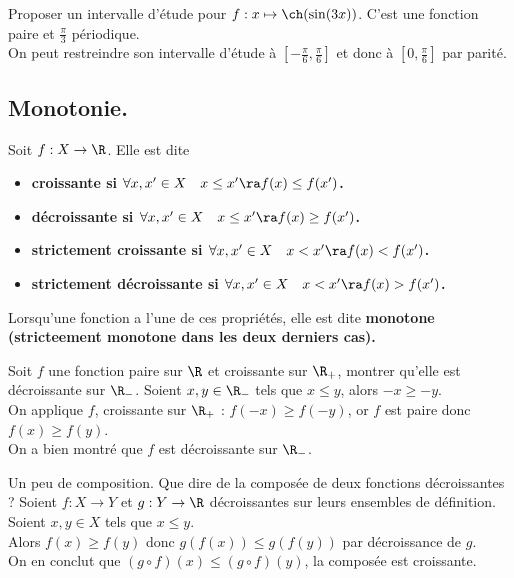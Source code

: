 \documentclass[11pt]{article}
\begin{document}
\begin{ex}{}{}
    Proposer un intervalle d'étude pour $f:x\mapsto\ch(\sin(3x))$.
    \tcblower
    C'est une fonction paire et $\frac{\pi}{3}$ périodique.\\
    On peut restreindre son intervalle d'étude à $[-\frac{\pi}{6},\frac{\pi}{6}]$ et donc à $[0,\frac{\pi}{6}]$ par parité.
\end{ex}

\subsection{Monotonie.}

\begin{defi}{}{}
    Soit $f:X\to\R$. Elle est dite
    \begin{itemize}
        \item \bf{croissante} si $\forall x,x'\in X\quad x\leq x' \ra f(x)\leq f(x')$.
        \item \bf{décroissante} si $\forall x,x'\in X\quad x\leq x' \ra f(x)\geq f(x')$.
        \item \bf{strictement croissante} si $\forall x,x'\in X\quad x< x' \ra f(x)< f(x')$.
        \item \bf{strictement décroissante} si $\forall x,x'\in X\quad x< x' \ra f(x)> f(x')$.
    \end{itemize}
    Lorsqu'une fonction a l'une de ces propriétés, elle est dite \bf{monotone} (stricteement monotone dans les deux derniers cas).
\end{defi}

\begin{ex}{}{}
    Soit $f$ une fonction paire sur $\R$ et croissante sur $\R_+$, montrer qu'elle est décroissante sur $\R_-$.
    \tcblower
    Soient $x,y\in\R_-$ tels que $x\leq y$, alors $-x\geq -y$.\\
    On applique $f$, croissante sur $\R_+$ : $f(-x)\geq f(-y)$, or $f$ est paire donc $f(x)\geq f(y)$.\\
    On a bien montré que $f$ est décroissante sur $\R_-$. 
\end{ex}

\begin{ex}{Un peu de composition.}{}
    Que dire de la composée de deux fonctions décroissantes ?
    \tcblower
    Soient $f:X\to Y$ et $g: Y\to \R$ décroissantes sur leurs ensembles de définition.\\
    Soient $x,y\in X$ tels que $x\leq y$.\\
    Alors $f(x)\geq f(y)$ donc $g(f(x))\leq g(f(y))$ par décroissance de $g$.\\
    On en conclut que $(g\circ f)(x)\leq (g\circ f)(y)$, la composée est croissante.
\end{ex}
\end{document}
